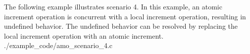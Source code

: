 \cexample
    {The following \CorCpp example illustrates scenario 4.  In this example, an
    \openshmem atomic increment operation is concurrent with a local increment
    operation, resulting in undefined behavior.  The undefined behavior can be
    resolved by replacing the local increment operation with an \openshmem
    atomic increment.}
    {./example_code/amo_scenario_4.c}
